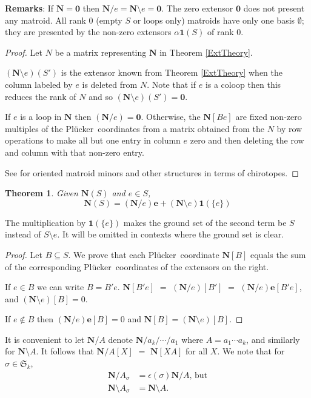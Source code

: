 \documentclass[12pt]{article}
\newtheorem{theorem}{Theorem}[section]
\theoremstyle{definition}
\newcommand{\Remarks}{\textbf{Remarks}}
\newcommand{\Perms}{\ensuremath{\mathfrak{S}}}
\newcommand{\ext}[1]{\ensuremath{\mathbf{#1}}}
\newcommand{\Plucker}{Pl\"{u}cker\ }
\begin{document}
\Remarks: 
If $\ext{N}=\ext{0}$ then $\ext{N}/e=\ext{N}\setminus e=\ext{0}$.
The zero extensor $\ext{0}$ does not present any matroid.  All rank 0
(empty $S$ or loops only) matroids
have only one basis $\emptyset$; they are presented by the non-zero
extensors $\alpha\ext{1}(S)$ of rank $0$.  

\begin{proof}
Let $N$ be a matrix representing $\ext{N}$ in Theorem \ref{ExtTheory}.

$(\ext{N}\setminus e)(S')$ is the extensor known from Theorem \ref{ExtTheory}
when the column labeled by $e$ is deleted from $N$.  Note that 
if $e$ is a coloop then
this reduces the rank of $N$ and so $(\ext{N}\setminus e)(S')=\ext{0}$.  

If $e$ is a loop in $\ext{N}$ then $(\ext{N}/e)=\ext{0}$.  Otherwise, 
the $\ext{N}[Be]$ are fixed non-zero multiples 
of the \Plucker coordinates from a 
matrix obtained from the $N$ by row operations to make all
but one entry in column $e$ zero and then deleting the row and column
with that non-zero entry.

See \cite[]{OMBOOK} for oriented matroid minors and other
structures in terms of chirotopes.
\end{proof}


\begin{theorem}
\label{ExtDC}
Given $\ext{N}(S)$ and $e\in S$,
\[
\ext{N}(S) = (\ext{N}/e)\ext{e} + (\ext{N}\setminus e)\ext{1}(\{e\})
\]
\end{theorem}
The multiplication by $\ext{1}(\{e\})$ makes the ground set of the 
second term be $S$ instead of $S\setminus e$.  It will be omitted in
contexts where the ground set is clear.

\begin{proof}
Let $B\subseteq S$.
We prove that each \Plucker coordinate $\ext{N}[B]$ equals the sum of the 
corresponding \Plucker coordinates of the extensors on the right.


If $e\in B$ we can write $B=B'e$.
$\ext{N}[B'e]$ $=$ $(\ext{N}/e)[B']$ 
$=$ $(\ext{N}/e)\ext{e}[B'e]$, and $(\ext{N}\setminus e)[B]=0$.

If $e\not\in B$ then $(\ext{N}/e)\ext{e}[B]=0$
and $\ext{N}[B]=(\ext{N}\setminus e)[B]$.
\end{proof}

It is convenient to let $\ext{N}/A$ denote 
$\ext{N}/a_k/\cdots/a_1$ where $A=a_1\cdots a_k$, and similarly for
$\ext{N}\setminus A$.  It follows that $\ext{N}/A[X]$
$=$ $\ext{N}[XA]$ for all $X$.  We note that for $\sigma\in\Perms_k$,
\begin{equation}
\label{PermuteContraction}
\begin{split}
\ext{N}/A_\sigma &= \epsilon(\sigma)\ext{N}/A\text{, but}\\
\ext{N}\setminus A_\sigma &= \ext{N}\setminus A.
\end{split}
\end{equation}
\end{document}
